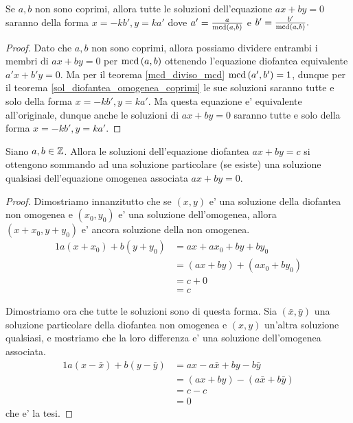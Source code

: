 \begin{corollary} \label{sol_diofantea_omogenea}
    Se $a, b$ non sono coprimi, allora tutte le soluzioni dell'equazione $ax + by = 0$ saranno della forma
    $x = -kb', y = ka'$ dove $a' = \frac{a}{\operatorname{mcd}\left(a, b\right)}$ e $b' = \frac{b'}{\operatorname{mcd}\left(a, b\right)}.$
\end{corollary}
\begin{proof}
    Dato che $a, b$ non sono coprimi, allora possiamo dividere entrambi i membri di $ax + by = 0$
    per $\operatorname{mcd}\left(a, b\right)$ ottenendo l'equazione diofantea equivalente $a'x + b'y = 0$. Ma per il teorema
    \ref{mcd_diviso_mcd} $\operatorname{mcd}\left(a', b'\right) = 1$, dunque per il teorema \ref{sol_diofantea_omogenea_coprimi}
    le sue soluzioni saranno tutte e solo della forma $x = -kb', y = ka'$. Ma questa equazione
    e' equivalente all'originale, dunque anche le soluzioni di $ax + by = 0$ saranno tutte e solo
    della forma $x = -kb', y = ka'$.
\end{proof}

\begin{theorem} \label{sol_diofantea_non_omog}
    Siano $a, b \in \mathbb{Z}$. Allora le soluzioni dell'equazione diofantea $ax + by = c$ 
    si ottengono sommando ad una soluzione particolare (se esiste) una soluzione qualsiasi dell'equazione
    omogenea associata $ax + by = 0$.
\end{theorem}
\begin{proof}
    Dimostriamo innanzitutto che se $(x, y)$ e' una soluzione della diofantea non omogenea e $(x_0, y_0)$
    e' una soluzione dell'omogenea, allora $(x+x_0, y+y_0)$ e' ancora soluzione della non omogenea.
    \begin{alignat*}{1}
        a(x + x_0) + b(y + y_0) &= ax + ax_0 + by + by_0 \\
                                &= (ax + by) + (ax_0 + by_0) \\
                                &= c + 0\\
                                &= c
    \end{alignat*}

    Dimostriamo ora che tutte le soluzioni sono di questa forma. Sia $(\bar{x}, \bar{y})$ una
    soluzione particolare della diofantea non omogenea e $(x, y)$ un'altra soluzione qualsiasi,
    e mostriamo che la loro differenza e' una soluzione dell'omogenea associata.
    \begin{alignat*}
        {1}
        a(x - \bar{x}) + b(y - \bar{y}) &= ax - a\bar{x} + by - b\bar{y} \\
                                        &= (ax + by) - (a\bar{x} + b\bar{y}) \\
                                        &= c - c\\
                                        &= 0
    \end{alignat*}
    che e' la tesi.
\end{proof}
